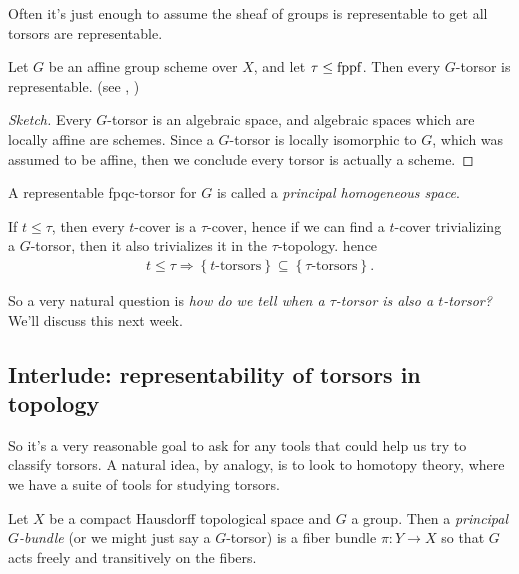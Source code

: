 \documentclass[11pt,openany]{book}
\begin{document}
Often it's just enough to assume the sheaf of groups is representable to get all torsors are representable.

\begin{proposition}\label{prop:affine-gp-torsors-representable} 
Let $G$ be an affine group scheme over $X$, and let $\tau\le \mathrm{fppf}$. Then every $G$-torsor is representable. (see \cite[0497]{Stacks}, \cite[3.25]{Youcis})
\end{proposition}
\begin{proof}[Sketch] Every $G$-torsor is an algebraic space, and algebraic spaces which are locally affine are schemes. Since a $G$-torsor is locally isomorphic to $G$, which was assumed to be affine, then we conclude every torsor is actually a scheme.
\end{proof}


\begin{terminology} A representable fpqc-torsor for $G$ is called a \textit{principal homogeneous space}.
\end{terminology}


\begin{remark} If $t \le \tau$, then every $t$-cover is a $\tau$-cover, hence if we can find a $t$-cover trivializing a $G$-torsor, then it also trivializes it in the $\tau$-topology. hence
\begin{align*}
    t\le \tau \Rightarrow \left\{ t\text{-torsors} \right\} \subseteq \left\{ \tau \text{-torsors} \right\}.
\end{align*}
\end{remark}
So a very natural question is \textit{how do we tell when a $\tau$-torsor is also a $t$-torsor?} We'll discuss this next week.


\subsection{Interlude: representability of torsors in topology}

So it's a very reasonable goal to ask for any tools that could help us try to classify torsors. A natural idea, by analogy, is to look to homotopy theory, where we have a suite of tools for studying torsors.

\begin{definition} Let $X$ be a compact Hausdorff topological space and $G$ a group. Then a \textit{principal $G$-bundle} (or we might just say a $G$-torsor) is a fiber bundle $\pi \colon Y \to X$ so that $G$ acts freely and transitively on the fibers.
\end{definition}
\end{document}
